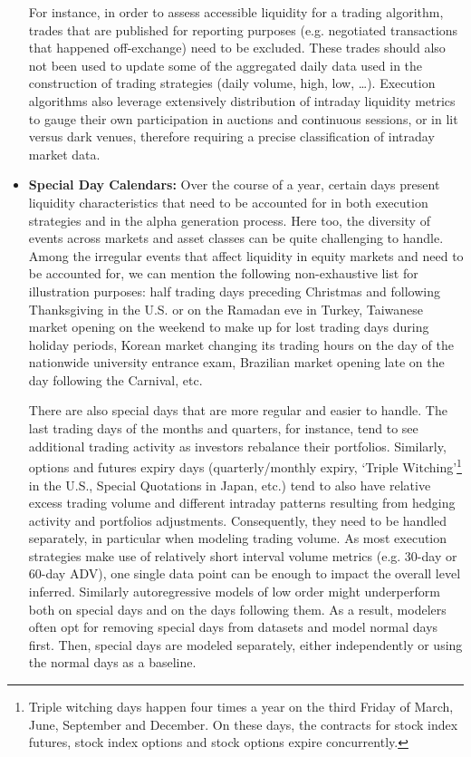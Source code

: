 \begin{itemize}
For instance, in order to assess accessible liquidity for a trading algorithm, trades that are published for reporting purposes (e.g. negotiated transactions that happened off-exchange) need to be excluded. These trades should also not been used to update some of the aggregated daily data used in the construction of trading strategies (daily volume, high, low, \dots). Execution algorithms also leverage extensively distribution of intraday liquidity metrics to gauge their own participation in auctions and continuous sessions, or in lit versus dark venues, therefore requiring a precise classification of intraday market data. 


\item \textbf{Special Day Calendars:} Over the course of a year, certain days present liquidity characteristics that need to be accounted for in both execution strategies and in the alpha generation process. Here too, the diversity of events across markets and asset classes can be quite challenging to handle. Among the irregular events that affect liquidity in equity markets and need to be accounted for, we can mention the following non-exhaustive list for illustration purposes: half trading days preceding Christmas and following Thanksgiving in the U.S. or on the Ramadan eve in Turkey, Taiwanese market opening on the weekend to make up for lost trading days during holiday periods, Korean market changing its trading hours on the day of the nationwide university entrance exam, Brazilian market opening late on the day following the Carnival, etc.


There are also special days that are more regular and easier to handle. The last trading days of the months and quarters, for instance, tend to see additional trading activity as investors rebalance their portfolios. Similarly, options and futures expiry days (quarterly/monthly expiry, `Triple Witching'\footnote{Triple witching days happen four times a year on the third Friday of March, June, September and December. On these days, the contracts for stock index futures, stock index options and stock options expire concurrently.} in the U.S., Special Quotations in Japan, etc.) tend to also have relative excess trading volume and different intraday patterns resulting from hedging activity and portfolios adjustments. Consequently, they need to be handled separately, in particular when modeling trading volume. As most execution strategies make use of relatively short interval volume metrics (e.g. 30-day or 60-day ADV), one single data point can be enough to impact the overall level inferred. Similarly autoregressive models of low order might underperform both on special days and on the days following them. As a result, modelers often opt for removing special days from datasets and model normal days first. Then, special days are modeled separately, either independently or using the normal days as a baseline. 



\end{itemize}

